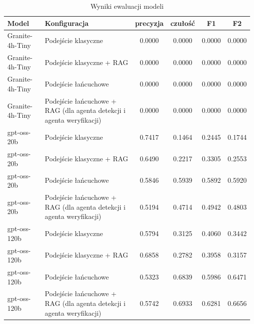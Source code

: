 \begin{table}[htbp]
\centering
\caption{Wyniki ewaluacji modeli}
\label{tab:wyniki}
\begin{tabular}{llcccc}
\toprule
Model & Konfiguracja & precyzja & czułość & F1 & F2 \\
\midrule
Granite-4h-Tiny & Podejście klasyczne & 0.0000 & 0.0000 & 0.0000 & 0.0000 \\
Granite-4h-Tiny & Podejście klasyczne + RAG & 0.0000 & 0.0000 & 0.0000 & 0.0000 \\
Granite-4h-Tiny & Podejście łańcuchowe & 0.0000 & 0.0000 & 0.0000 & 0.0000 \\
Granite-4h-Tiny & Podejście łańcuchowe + RAG (dla agenta detekcji i agenta weryfikacji) & 0.0000 & 0.0000 & 0.0000 & 0.0000 \\
gpt-oss-20b & Podejście klasyczne & 0.7417 & 0.1464 & 0.2445 & 0.1744 \\
gpt-oss-20b & Podejście klasyczne + RAG & 0.6490 & 0.2217 & 0.3305 & 0.2553 \\
gpt-oss-20b & Podejście łańcuchowe & 0.5846 & 0.5939 & 0.5892 & 0.5920 \\
gpt-oss-20b & Podejście łańcuchowe + RAG (dla agenta detekcji i agenta weryfikacji) & 0.5194 & 0.4714 & 0.4942 & 0.4803 \\
gpt-oss-120b & Podejście klasyczne & 0.5794 & 0.3125 & 0.4060 & 0.3442 \\
gpt-oss-120b & Podejście klasyczne + RAG & 0.6858 & 0.2782 & 0.3958 & 0.3157 \\
gpt-oss-120b & Podejście łańcuchowe & 0.5323 & 0.6839 & 0.5986 & 0.6471 \\
gpt-oss-120b & Podejście łańcuchowe + RAG (dla agenta detekcji i agenta weryfikacji) & 0.5742 & 0.6933 & 0.6281 & 0.6656 \\
\bottomrule
\end{tabular}
\end{table}
